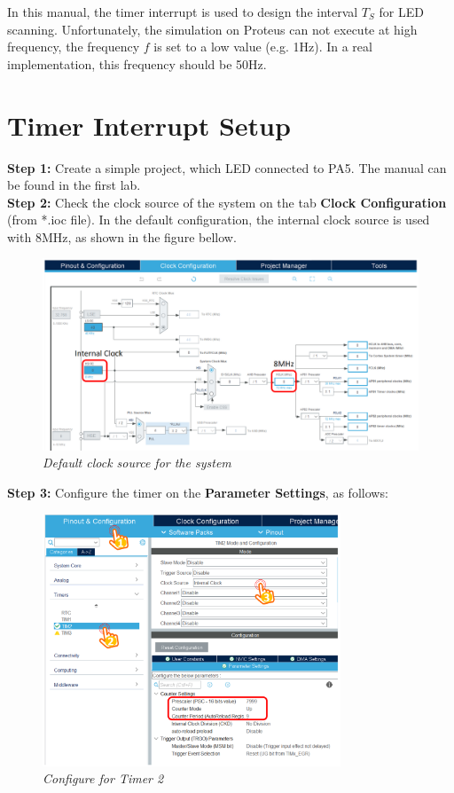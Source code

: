 In this manual, the timer interrupt is used to design the interval $T_S$ for LED scanning. Unfortunately, the simulation on Proteus can not execute at high frequency, the frequency $f$ is set to a low value (e.g. 1Hz). In a real implementation, this frequency should be 50Hz.


\newpage
\section{Timer Interrupt Setup}
\textbf{Step 1: } Create a simple project, which LED connected to PA5. The manual can be found in the first lab.\\

\textbf{Step 2: } Check the clock source of the system on the tab \textbf{Clock Configuration} (from *.ioc file). In the default configuration, the internal clock source is used with 8MHz, as shown in the figure bellow.

\begin{figure}[!htp]
    \centering
    \includegraphics[width=5.5in]{source/picture/bai_2/lab2_m1.PNG}
    \caption{\textit{Default clock source for the system}}
    \label{bai2_m1}
\end{figure}

\textbf{Step 3: } Configure the timer on the \textbf{Parameter Settings}, as follows:
\begin{figure}[!htp]
    \centering
    \includegraphics[width=3.5in]{source/picture/bai_2/lab2_m2.PNG}
    \caption{\textit{Configure for Timer 2}}
    \label{bai2_m2}
\end{figure}

